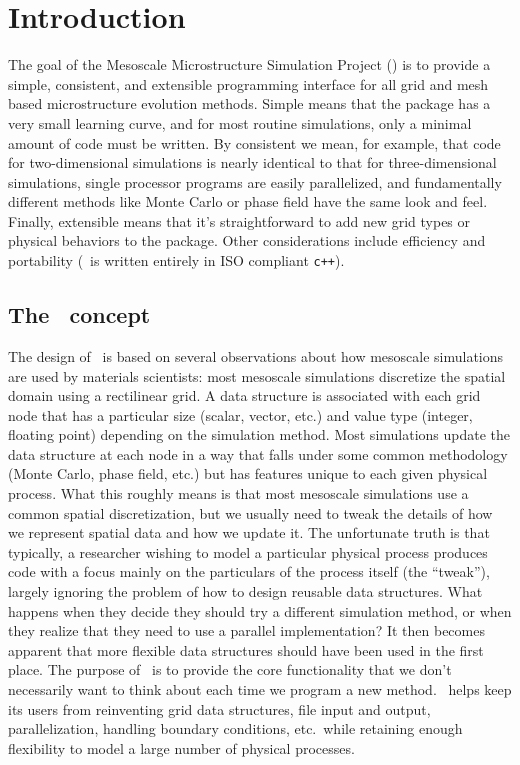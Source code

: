 
\chapter{Introduction}
The goal of the Mesoscale Microstructure Simulation Project (\MMSP) is to provide a simple, consistent, and extensible programming interface for all grid and mesh based microstructure evolution methods. Simple means that the package has a very small learning curve, and for most routine simulations, only a minimal amount of code must be written. By consistent we mean, for example, that code for two-dimensional simulations is nearly identical to that for three-dimensional simulations, single processor programs are easily parallelized, and fundamentally different methods like Monte Carlo or phase field have the same look and feel. Finally, extensible means that it's straightforward to add new grid types or physical behaviors to the package. Other considerations include efficiency and portability (\MMSP\ is written entirely in ISO compliant {\tt c++}).

\section{The \MMSP\ concept}
The design of \MMSP\ is based on several observations about how mesoscale simulations are used by materials scientists: most mesoscale simulations discretize the spatial domain using a rectilinear grid. A data structure is associated with each grid node that has a particular size (scalar, vector, etc.) and value type (integer, floating point) depending on the simulation method. Most simulations update the data structure at each node in a way that falls under some common methodology (Monte Carlo, phase field, etc.) but has features unique to each given physical process.  What this roughly means is that most mesoscale simulations use a common spatial discretization, but we usually need to tweak the details of how we represent spatial data and how we update it. The unfortunate truth is that typically, a researcher wishing to model a particular physical process produces code with a focus mainly on the particulars of the process itself (the ``tweak''), largely ignoring the problem of how to design reusable data structures. What happens when they decide they should try a different simulation method, or when they realize that they need to use a parallel implementation?  It then becomes apparent that more flexible data structures should have been used in the first place.  The purpose of \MMSP\ is to provide the core functionality that we don't necessarily want to think about each time we program a new method.  \MMSP\ helps keep its users from reinventing grid data structures, file input and output, parallelization, handling boundary conditions, etc.\ while retaining enough flexibility to model a large number of physical processes.

